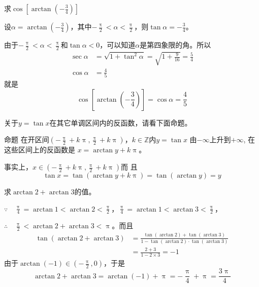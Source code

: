 \begin{example}
    求$\cos\left[\arctan\left(-\frac{3}{4}\right)\right]$
\end{example}

\begin{solution}
设$\alpha=\arctan\left(-\frac{3}{4}\right)$，其中$-\frac{\uppi}{2}<\alpha<\frac{\uppi}{2}$，则$\tan\alpha=-\frac{3}{4}$。

由于$-\frac{\uppi}{2}<\alpha<\frac{\uppi}{2}$和$\tan\alpha<0$，可以知道$\alpha$是第四象限的角。所以
\[\begin{split}
    \sec\alpha&=\sqrt{1+\tan^2\alpha}=\sqrt{1+\frac{9}{16}}=\frac{5}{4}\\
    \cos\alpha&=\frac{4}{5}
\end{split}\]
就是
\[\cos\left[\arctan\left(-\frac{3}{4}\right)\right]=\cos\alpha=\frac{4}{5}\]
\end{solution}

关于$y=\tan x$在其它单调区间内的反函数，请看下面命题。

\begin{blk}{命题}
    在开区间$\left(-\frac{\uppi}{2}+k\uppi ,\frac{\uppi}{2}+k\uppi 
\right)$，$k\in\mathbb{Z}$内$y=\tan x$
由$-\infty$上升到$+\infty$, 在这些区间上的反函数是
$x=\arctan y+k\uppi$。
\end{blk}

事实上，$x\in \left(-\frac{\uppi}{2}+k\uppi ,\frac{\uppi}{2}+k\uppi 
\right)$而
且
\[\tan x=\tan (\arctan y+k\uppi )=\tan (\arctan y)=y\]




\begin{example}
    求$\arctan 2+\arctan 3$的值。
\end{example}

\begin{solution}
    $\because\quad \frac{\uppi}{4}=\arctan 1<\arctan 2<\frac{\uppi}{2}$，$\frac{\uppi}{4}=\arctan 1<\arctan 3<\frac{\uppi}{2}$，

    $\therefore\quad \frac{\uppi}{2}<\arctan 2+\arctan 3<\uppi$。而且
\[\begin{split}
    \tan(\arctan 2+\arctan 3)&=\frac{\tan (\arctan 2)+\tan (\arctan  3)}{1-\tan(\arctan 2)\cdot \tan (\arctan 3)}\\
    &=\frac{2+3}{1-2\times 3}=-1
\end{split}\]
由于$\arctan (-1)\in \left(-\frac{\uppi}{2},0\right)$，于是
\[\arctan 2+\arctan 3=\arctan (-1)+\uppi=-\frac{\uppi}{4}+\uppi=\frac{3\uppi}{4}\]
\end{solution}


